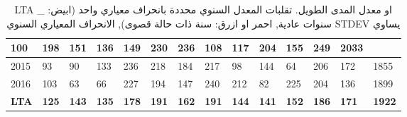 \documentclass[11pt,a4paper]{article}
\begin{document}
\begin{table}[h!]
\begin{tabular} { llllllllllllll }
\cellcolor[HTML]{ 62B0C3 } 100
 & \cellcolor[HTML]{ FA8C21 } 198  & \cellcolor[HTML]{ E9F949 } 151  & \cellcolor[HTML]{ 77E16A } 136  & \cellcolor[HTML]{ E9F949 } 149  & \cellcolor[HTML]{ F2413D } 230  & \cellcolor[HTML]{ F2413D } 236  & \cellcolor[HTML]{ 62B0C3 } 108  & \cellcolor[HTML]{ 77E16A } 117  & \cellcolor[HTML]{ FA8C21 } 204  & \cellcolor[HTML]{ E9F949 } 155  & \cellcolor[HTML]{ F2413D } 249

 & 2033

\\  \hline

 2015 &

\cellcolor[HTML]{ 62B0C3 } 93
 & \cellcolor[HTML]{ 62B0C3 } 90  & \cellcolor[HTML]{ 77E16A } 133  & \cellcolor[HTML]{ F2413D } 236  & \cellcolor[HTML]{ FA8C21 } 218  & \cellcolor[HTML]{ FFD62B } 184  & \cellcolor[HTML]{ FA8C21 } 217  & \cellcolor[HTML]{ 62B0C3 } 98  & \cellcolor[HTML]{ E9F949 } 144  & \cellcolor[HTML]{ 3A52bA } 64  & \cellcolor[HTML]{ FA8C21 } 206  & \cellcolor[HTML]{ FFD62B } 172

 & 1855

\\  \hline

 2016 &

\cellcolor[HTML]{ 62B0C3 } 103
 & \cellcolor[HTML]{ 3A52bA } 63  & \cellcolor[HTML]{ 3A52bA } 66  & \cellcolor[HTML]{ F2413D } 227  & \cellcolor[HTML]{ FFD62B } 194  & \cellcolor[HTML]{ E9F949 } 147  & \cellcolor[HTML]{ F2413D } 240  & \cellcolor[HTML]{ FA8C21 } 212  & \cellcolor[HTML]{ 3A52bA } 82  & \cellcolor[HTML]{ F2413D } 225  & \cellcolor[HTML]{ FA8C21 } 204  & \cellcolor[HTML]{ 77E16A } 136

 & 1899

\\  \hline
\rowcolor[HTML]{ EFEFEF }
\textbf{ LTA }
& \textbf{ 125 }
& \textbf{ 143 }
& \textbf{ 135 }
& \textbf{ 178 }
& \textbf{ 191 }
& \textbf{ 162 }
& \textbf{ 191 }
& \textbf{ 144 }
& \textbf{ 141 }
& \textbf{ 152 }
& \textbf{ 186 }
& \textbf{ 171 }
& \textbf{ 1922 }

\\  \hline
\end{tabular}

\caption[dcdcds]{
\textarabic{
LTA \_ او معدل المدى الطويل. تقلبات المعدل السنوي محددة بانحراف معياري واحد (ابيض: سنوات عادية, احمر او ازرق: سنة 
ذات حالة قصوى), الانحراف المعياري السنوي STDEV يساوي
}
}
\label{ LTA-_-او-معدل-المدى-الطويل.-تقلبات-المعدل-السنوي-محددة-ب
انحراف-معياري-واحد-(ابيض:-سنوات-عادية,-احمر-او-ازرق:-سنة-ذات-حالة-قصوى),-الانحراف-المعياري-السنوي-STDEV-يساوي- }

\end{table}
\end{document}
